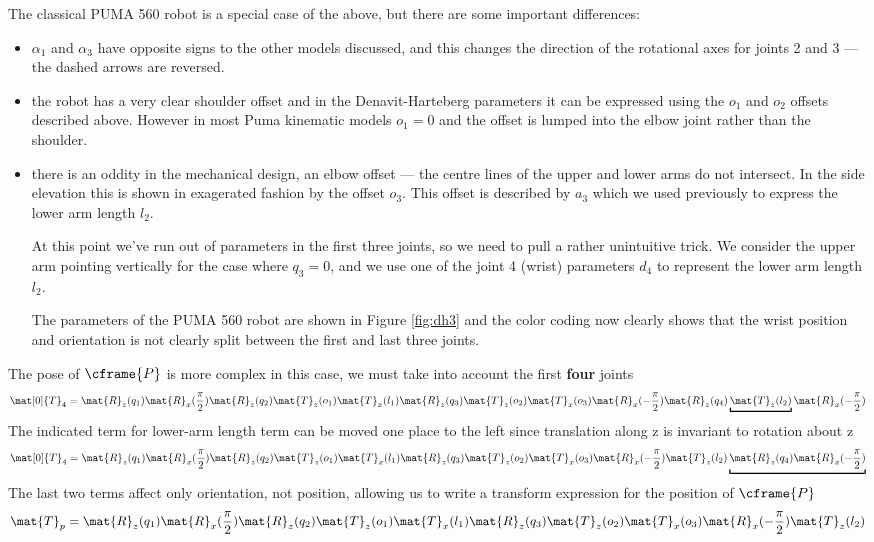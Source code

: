 \documentclass[11pt]{article}
\numberwithin{equation}{section}
\begin{document}
The classical PUMA 560 robot is a special case of the above, but there are some important differences:
\begin{itemize}
\item $\alpha_1$ and $\alpha_3$ have opposite signs to the other models discussed, and this changes the direction of the rotational axes for
joints 2 and 3 --- the dashed arrows are reversed.

\item the robot has a very clear shoulder offset and in the Denavit-Harteberg parameters it can be expressed using the
$o_1$ and $o_2$ offsets described above.   However in most Puma kinematic models $o_1=0$ and the offset is lumped into the elbow joint rather than the shoulder.

\item there is an oddity in the mechanical design, an elbow offset --- the centre lines of the upper and lower arms do not intersect.
In the side elevation this is shown in exagerated fashion by the offset $o_3$.  This offset is described by $a_3$ which we used previously to express the lower arm length $l_2$.

At this point we've run out of parameters in the first three joints, so we need to pull a rather unintuitive trick.
We consider the upper arm pointing vertically for the case where $q_3=0$, and 
 we use one of the joint 4 (wrist) parameters $d_4$ to represent the lower arm length $l_2$.
 
 The parameters of the PUMA 560 robot are shown in Figure \ref{fig:dh3} and the color coding now clearly shows that the wrist position and orientation is not clearly split between the first and last
three joints.
 \end{itemize}

The pose of $\cframe{P}$ is more complex in this case, we must take into account the first \textbf{four} joints
\[
\mat[0]{T}_4 = \mat{R}_z(q_1) \mat{R}_x(\frac{\pi}{2}) \mat{R}_z(q_2)  \mat{T}_z(o_1) \mat{T}_x(l_1) \mat{R}_z(q_3) \mat{T}_z(o_2) \mat{T}_x(o_3) \mat{R}_x(-\frac{\pi}{2})  \mat{R}_z(q_4)  \underbracket{\mat{T}_z(l_2)} \mat{R}_x(-\frac{\pi}{2}) 
\]
The indicated term for lower-arm length term can be moved one place to the left since translation along z is invariant to rotation about z
\[
\mat[0]{T}_4 = \mat{R}_z(q_1) \mat{R}_x(\frac{\pi}{2}) \mat{R}_z(q_2)  \mat{T}_z(o_1) \mat{T}_x(l_1) \mat{R}_z(q_3) \mat{T}_z(o_2) \mat{T}_x(o_3) \mat{R}_x(-\frac{\pi}{2})   \mat{T}_z(l_2)  \underbracket{\mat{R}_z(q_4) \mat{R}_x(-\frac{\pi}{2})}
\]
The last two terms affect only orientation, not position, allowing us to write a transform expression for the position of $\cframe{P}$
\[
\mat{T}_p = \mat{R}_z(q_1) \mat{R}_x(\frac{\pi}{2}) \mat{R}_z(q_2)  \mat{T}_z(o_1) \mat{T}_x(l_1) \mat{R}_z(q_3) \mat{T}_z(o_2) \mat{T}_x(o_3) \mat{R}_x(-\frac{\pi}{2})   \mat{T}_z(l_2)
\]
\end{document}
